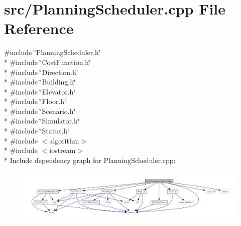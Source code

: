 \section{src/\+Planning\+Scheduler.cpp File Reference}
\label{_planning_scheduler_8cpp}
{\ttfamily \#include \char`\"{}Planning\+Scheduler.\+h\char`\"{}}\\*
{\ttfamily \#include \char`\"{}Cost\+Function.\+h\char`\"{}}\\*
{\ttfamily \#include \char`\"{}Direction.\+h\char`\"{}}\\*
{\ttfamily \#include \char`\"{}Building.\+h\char`\"{}}\\*
{\ttfamily \#include \char`\"{}Elevator.\+h\char`\"{}}\\*
{\ttfamily \#include \char`\"{}Floor.\+h\char`\"{}}\\*
{\ttfamily \#include \char`\"{}Scenario.\+h\char`\"{}}\\*
{\ttfamily \#include \char`\"{}Simulator.\+h\char`\"{}}\\*
{\ttfamily \#include \char`\"{}Status.\+h\char`\"{}}\\*
{\ttfamily \#include $<$algorithm$>$}\\*
{\ttfamily \#include $<$iostream$>$}\\*
Include dependency graph for Planning\+Scheduler.\+cpp\+:\nopagebreak
\begin{figure}[H]
\begin{center}
\leavevmode
\includegraphics[width=350pt]{_planning_scheduler_8cpp__incl}
\end{center}
\end{figure}
